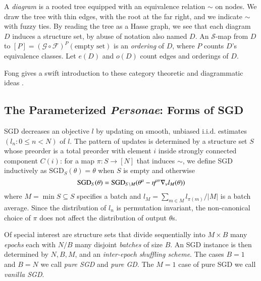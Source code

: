 \documentclass{article}
\newcommand{\Free}{\mathcal{F}}
\newcommand{\Forg}{\mathcal{G}}
\newcommand{\Ss}{\mathcal{S}}
\newcommand{\SGD}{\text{\textnormal{SGD}}}
\newcommand{\wabs}[1]{\left|#1\right|}
\begin{document}
        A \emph{diagram} is a rooted tree equipped with an equivalence relation
        $\sim$ on nodes.  We draw the tree with thin edges, with the root at
        the far right, and we indicate $\sim$ with fuzzy ties.  By reading the
        tree as a Hasse graph, we see that each diagram $D$ induces a structure
        set, by abuse of notation also named $D$.  An $\Ss$-map from $D$ to
        $[P]=(\Forg\circ\Free)^P(\text{empty set})$ is an \emph{ordering} of
        $D$, where $P$ counts $D$'s equivalence classes.  Let $e(D)$ and $o(D)$
        count edges and orderings of $D$.
    
        Fong gives a swift introduction to these category theoretic and
        diagrammatic ideas .
            

    \subsection{The Parameterized \emph{Personae}: Forms of SGD}
        SGD decreases an objective $l$ by updating on smooth, unbiased i.i.d.
        estimates $(l_n: 0\leq n<N)$ of $l$.  The pattern of updates is
        determined by a structure set $S$ whose preorder is a total preorder
        with element $i$ inside strongly connected component $C(i)$: for a map
        $\pi:S\to [N]$ that induces $\sim$, we define SGD inductively as
        $\text{SGD}_{S}(\theta) = \theta$ when $S$ is empty and otherwise
        $$
            \SGD_S(\theta) =
                \SGD_{S\setminus M}(\theta^\mu - \eta^{\mu\nu} \nabla_\nu l_{M}(\theta))
        $$
        where $M = \min S \subseteq S$ specifies a batch and $l_M = \sum_{m\in
        M} l_{\pi(m)} / \wabs{M}$ is a batch average.  Since the distribution
        of $l_n$ is permutation invariant, the non-canonical choice of $\pi$
        does not affect the distribution of output $\theta$s.
    
        Of special interest are structure sets that divide sequentially into
        $M\times B$ many \emph{epochs} each with $N/B$ many disjoint
        \emph{batches} of size $B$.  An SGD instance is then determined by $N,
        B, M$, and an \emph{inter-epoch shuffling scheme}.  The cases $B=1$ and
        $B=N$ we call \emph{pure SGD} and \emph{pure GD}.  The $M=1$ case of
        pure SGD we call \emph{vanilla SGD}.
\end{document}
